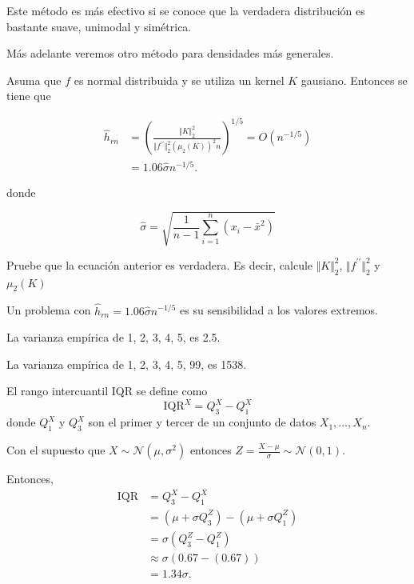 \documentclass[
  12pt,
]{book}
\theoremstyle{definition}
\theoremstyle{definition}
\theoremstyle{definition}
\theoremstyle{remark}
\let\BeginKnitrBlock\begin \let\EndKnitrBlock\end
\begin{document}
\BeginKnitrBlock{remark}
{}Este método es más efectivo si se conoce que la verdadera distribución es bastante suave, unimodal y simétrica.

Más adelante veremos otro método para densidades más generales.
\EndKnitrBlock{remark}

Asuma que \(f\) es normal distribuida y se utiliza un kernel \(K\) gausiano. Entonces se tiene que

\begin{align*}
\hat{h}_{rn} & =\left(\frac{\Vert K\Vert_{2}^{2}}{\Vert f^{\prime\prime}\Vert_{2}^{2}\left(\mu_{2}(K)\right)^{2}n}\right)^{1/5}=O\left( n^{-1/5} \right) \\
& =1.06 \hat{\sigma} n^{-1/5}.
\end{align*}

donde

\begin{equation*}
\hat{\sigma} = \sqrt{\frac{1}{n-1} \sum_{i=1}^{n} \left( x_{i}-\bar{x}^{2} \right)}
\end{equation*}

\BeginKnitrBlock{exercise}
\protect\hypertarget{exr:unnamed-chunk-32}{}{\label{exr:unnamed-chunk-32} }Pruebe que la ecuación anterior es verdadera. Es decir, calcule \(\Vert K\Vert_{2}^{2}\), \(\Vert f^{\prime\prime}\Vert_{2}^{2}\) y \(\mu_{2}(K)\)
\EndKnitrBlock{exercise}

\BeginKnitrBlock{remark}
{}Un problema con \(\hat{h}_{rn}=1.06 \hat{\sigma} n^{-1/5}\) es su sensibilidad a los valores extremos.
\EndKnitrBlock{remark}

\BeginKnitrBlock{example}
\protect\hypertarget{exm:unnamed-chunk-34}{}{\label{exm:unnamed-chunk-34} }La varianza empírica de 1, 2, 3, 4, 5, es 2.5.

La varianza empírica de 1, 2, 3, 4, 5, 99, es 1538.
\EndKnitrBlock{example}

El rango intercuantil IQR se define como
\begin{equation*}
\mathrm{IQR}^{X} = Q^{X}_{3} - Q^{X}_{1}
\end{equation*}
donde \(Q^{X}_{1}\) y \(Q^{X}_{3}\) son el primer y tercer de un conjunto de datos \(X_{1},\ldots, X_n\).

Con el supuesto que \(X\sim \mathcal{N}(\mu,\sigma^{2})\) entonces \(\displaystyle Z = \frac{X-\mu}{\sigma} \sim \mathcal{N}(0,1)\).

Entonces,
\begin{align*}
\mathrm{IQR}
& = Q^{X}_{3} - Q^{X}_{1}                                                     \\
& = \left( \mu+\sigma Q^{Z}_{3} \right) - \left( \mu+\sigma Q^{Z}_{1} \right) \\
& = \sigma \left(Q^{Z}_{3} - Q^{Z}_{1} \right)                                \\
& \approx \sigma \left( 0.67 - (0.67) \right)                                 \\
& =1.34 \sigma.
\end{align*}
\end{document}
